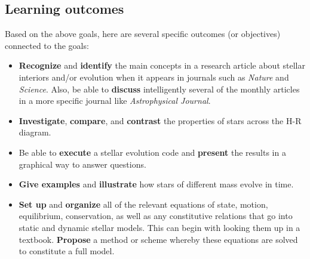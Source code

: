 \documentclass[10pt,letterpaper]{article}
\begin{document}
\subsection*{Learning outcomes}
Based on the above goals, here are several specific  outcomes (or objectives) connected to the goals:
\begin{itemize}


\item {\bf Recognize} and {\bf identify} the main concepts in a research article about stellar interiors and/or evolution when it appears in journals such as  \textit{Nature} and \textit{Science}. Also, be able to {\bf discuss} intelligently several of the monthly articles in a more specific journal like \textit{Astrophysical Journal}.


\item {\bf Investigate}, {\bf compare}, and {\bf contrast} the properties of  stars across the H-R diagram.

\item Be able to {\bf execute} a stellar evolution code and {\bf present} the results in a graphical way  to answer questions.

\item {\bf Give examples} and {\bf illustrate} how stars of different mass evolve in time.





\item {\bf Set up} and {\bf organize} all of the relevant equations of state, motion, equilibrium, conservation, as well as any constitutive relations that go into static and dynamic stellar models. This can begin with looking them up in a textbook. {\bf Propose} a method or scheme whereby these equations are solved to constitute a full model. 



\end{itemize}
\end{document}

